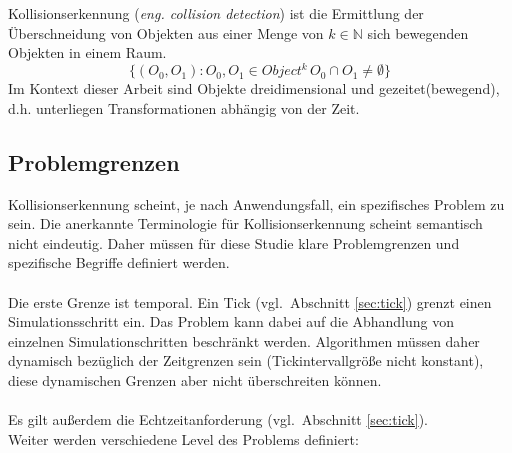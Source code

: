 Kollisionserkennung (\textit{eng. collision detection}) ist die Ermittlung der Überschneidung von Objekten aus einer Menge von $k\in\mathbb{N}$ sich bewegenden Objekten in einem Raum.\\
$$\{(O_0, O_1) : O_0, O_1 \in Object^k\, O_0 \cap O_1 \neq \emptyset\}$$
Im Kontext dieser Arbeit sind Objekte dreidimensional und gezeitet(bewegend), d.h. unterliegen Transformationen abhängig von der Zeit.
\\
\subsection{Problemgrenzen}
Kollisionserkennung scheint, je nach Anwendungsfall, ein spezifisches Problem zu sein. Die anerkannte Terminologie für Kollisionserkennung scheint semantisch nicht eindeutig. Daher müssen für diese Studie klare Problemgrenzen und spezifische Begriffe definiert werden.\\
\\
Die erste Grenze ist temporal. Ein Tick (vgl.~Abschnitt \ref{sec:tick}) grenzt einen Simulationsschritt ein. Das Problem kann dabei auf die Abhandlung von einzelnen Simulationschritten beschränkt werden. Algorithmen müssen daher dynamisch bezüglich der Zeitgrenzen sein (Tickintervallgröße nicht konstant), diese dynamischen Grenzen aber nicht überschreiten können.\\
\\
Es gilt außerdem die Echtzeitanforderung (vgl.~Abschnitt \ref{sec:tick}).
\\
Weiter werden verschiedene Level des Problems definiert:
